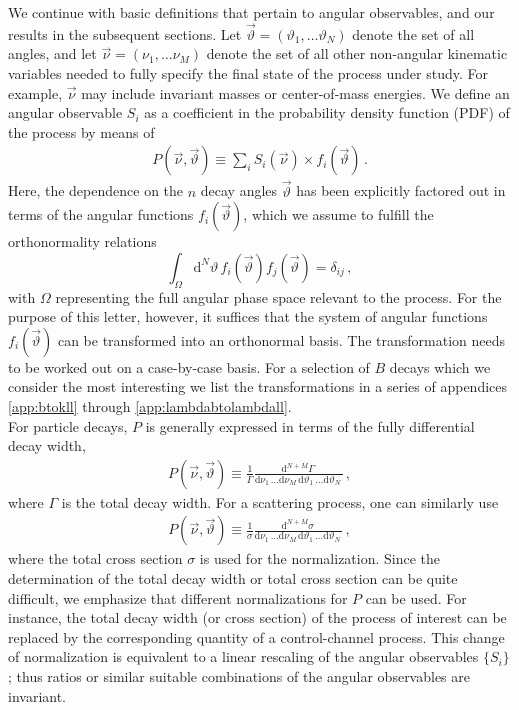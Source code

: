 \documentclass[aps,prd,reprint,nofootinbib,preprintnumbers]{revtex4}
\newcommand{\rmdx}[1]{\mbox{d} #1 \,} %
\newcommand{\nuvec}{\vec{\nu}}
\newcommand{\thvec}{\vec{\vartheta}}
\renewcommand{\theta}{\vartheta}
\begin{document}
We continue with basic definitions that pertain to angular observables, and our
results in the subsequent sections. Let $\thvec = (\theta_1, \dots \theta_N)$ denote the set of all
angles, and let $\nuvec = (\nu_1, \dots \nu_M)$ denote the set of all
other non-angular kinematic variables needed to fully specify the
final state of the process under study. For example, $\nuvec$ may
include invariant masses or center-of-mass energies. We define an
angular observable $S_i$ as a coefficient in the probability density
function (PDF) of the process by means of
\begin{align}
    \label{eq:def-P}
    P(\nuvec, \thvec) \equiv \sum_i S_i(\nuvec) \times f_i(\thvec)\,.
\end{align}
Here, the dependence on the $n$ decay angles $\thvec$ has been
explicitly factored out in terms of the angular functions
$f_i(\thvec)$, which we assume to fulfill the orthonormality relations
\begin{equation}
    \label{eq:def-ortho-rel}
    \int_\Omega \rmdx{^N \theta} f_i(\thvec) f_j(\thvec)  = \delta_{ij}\,,
\end{equation}
with $\Omega$ representing the full angular phase space relevant to the process.
For the purpose of this letter, however, it suffices that the system
of angular functions $f_i(\thvec)$ can be transformed into an
orthonormal basis. The transformation needs to be worked out on a
case-by-case basis. For a selection of $B$ decays which we consider the most interesting
we list the transformations in a series of appendices \ref{app:btokll} through
\ref{app:lambdabtolambdall}.\\


For particle decays, $P$ is generally expressed in terms of the fully differential decay width,
\begin{align}
    \label{eq:def-P-decay}
    P(\nuvec, \thvec) \equiv \frac{1}{\Gamma}\frac{\rmdx{^{N+M}\Gamma}}{\rmdx{\nu_1} \dots \rmdx{\nu_M} \rmdx{\theta_1} \dots \rmdx{\theta_N}}\,,
\end{align}
where $\Gamma$ is the total decay width. For a scattering process, one can similarly use
\begin{align}
    \label{eq:def-P-scattering}
    P(\nuvec, \thvec) \equiv \frac{1}{\sigma}\frac{\rmdx{^{N+M}\sigma}}{\rmdx{\nu_1} \dots \rmdx{\nu_M} \rmdx{\theta_1} \dots \rmdx{\theta_N}}\,,
\end{align}
where the total cross section $\sigma$ is used for the
normalization. Since the determination of the total decay width or
total cross section can be quite difficult, we emphasize that
different normalizations for $P$ can be used.  For instance, the total
decay width (or cross section) of the process of interest can be
replaced by the corresponding quantity of a control-channel
process. This change of normalization is equivalent to a linear rescaling of
the angular observables $\lbrace S_i\rbrace$; thus ratios or similar suitable combinations
of the angular observables are invariant.\\
\end{document}

